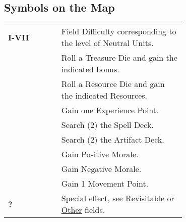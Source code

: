 
\begin{multicols*}{2}

\subsection*{Symbols on the Map}

\begingroup
  \renewcommand{\arraystretch}{1.5}
  \begin{tabularx}{\linewidth}{Y m{0.7\linewidth}}
    \small
    \mbox{\textbf{I-VII}} & Field Difficulty corresponding to the level of Neutral Units. \\
     & Roll a Treasure Die and gain the indicated bonus. \\
     & Roll a Resource Die and gain the indicated Resources. \\
     & Gain one Experience Point. \\
     & Search (2) the Spell Deck. \\
     & Search (2) the Artifact Deck. \\
     & Gain Positive Morale. \\
     & Gain Negative Morale. \\
     & Gain 1 Movement Point. \\
    {\huge\textbf{?}} & Special effect, see \hyperlink{Revisitable Fields}{Revisitable} or \hyperlink{Other Fields}{Other} fields.\\
  \end{tabularx}
\endgroup

\bigskip


\end{multicols*}
